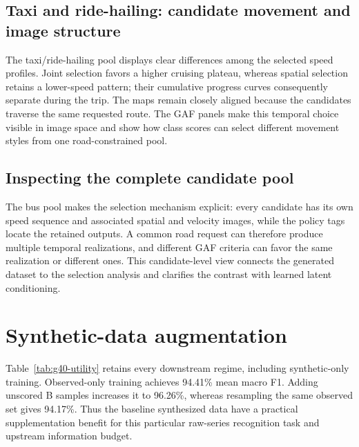 \subsection{Taxi and ride-hailing: candidate movement and image structure}
The taxi/ride-hailing pool displays clear differences among the selected speed profiles. Joint selection favors a higher cruising plateau, whereas spatial selection retains a lower-speed pattern; their cumulative progress curves consequently separate during the trip. The maps remain closely aligned because the candidates traverse the same requested route. The GAF panels make this temporal choice visible in image space and show how class scores can select different movement styles from one road-constrained pool.

\FloatBarrier

\subsection{Inspecting the complete candidate pool}
The bus pool makes the selection mechanism explicit: every candidate has its own speed sequence and associated spatial and velocity images, while the policy tags locate the retained outputs. A common road request can therefore produce multiple temporal realizations, and different GAF criteria can favor the same realization or different ones. This candidate-level view connects the generated dataset to the selection analysis and clarifies the contrast with learned latent conditioning.
\FloatBarrier

\section{Synthetic-data augmentation}
Table~\ref{tab:g40-utility} retains every downstream regime, including synthetic-only training. Observed-only training achieves 94.41\% mean macro F1. Adding unscored B samples increases it to 96.26\%, whereas resampling the same observed set gives 94.17\%. Thus the baseline synthesized data have a practical supplementation benefit for this particular raw-series recognition task and upstream information budget.

